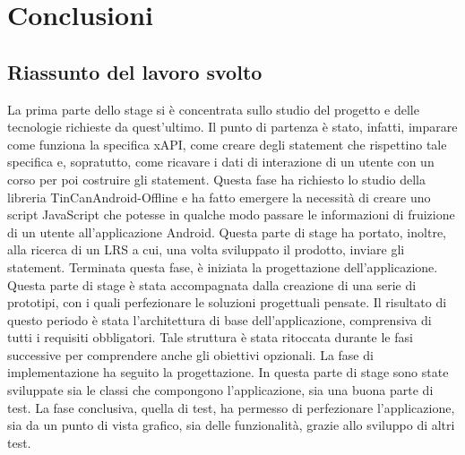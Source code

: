 \documentclass[../Tesi.tex]{subfiles}
\begin{document}
\section{Conclusioni}
	\subsection{Riassunto del lavoro svolto}
	La prima parte dello stage si è concentrata sullo studio del progetto e delle tecnologie richieste da quest'ultimo. Il punto di partenza è stato, infatti, imparare come funziona la specifica xAPI, come creare degli statement che rispettino tale specifica e, sopratutto, come ricavare i dati di interazione di un utente con un corso per poi costruire gli statement. Questa fase ha richiesto lo studio della libreria TinCanAndroid-Offline e ha fatto emergere la necessità di creare uno script JavaScript che potesse in qualche modo passare le informazioni di fruizione di un utente all'applicazione Android. Questa parte di stage ha portato, inoltre, alla ricerca di un LRS a cui, una volta sviluppato il prodotto, inviare gli statement. Terminata questa fase, è iniziata la progettazione dell'applicazione. Questa parte di stage è stata accompagnata dalla creazione di una serie di prototipi, con i quali perfezionare le soluzioni progettuali pensate. Il risultato di questo periodo è stata l'architettura di base dell'applicazione, comprensiva di tutti i requisiti obbligatori. Tale struttura è stata ritoccata durante le fasi successive per comprendere anche gli obiettivi opzionali. La fase di implementazione ha seguito la progettazione. In questa parte di stage sono state sviluppate sia le classi che compongono l'applicazione, sia una buona parte di test. La fase conclusiva, quella di test, ha permesso di perfezionare l'applicazione, sia da un punto di vista grafico, sia delle funzionalità, grazie allo sviluppo di altri test.\\
\end{document}
